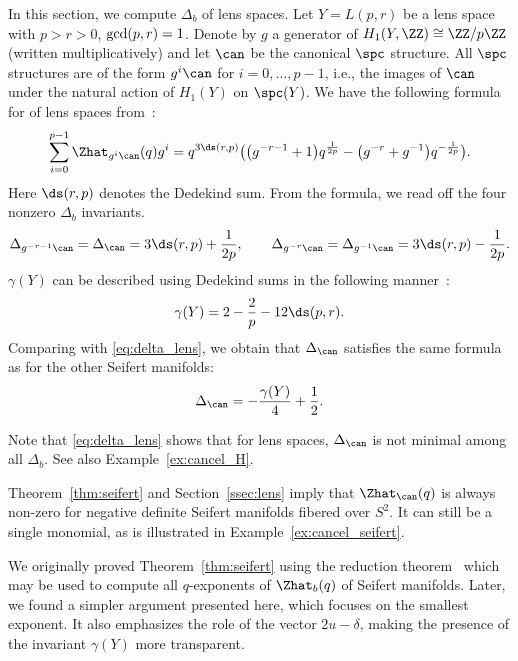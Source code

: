 \documentclass[pdftex]{sigma}
\begin{document}
In this section, we compute $\Delta_b$ of lens spaces. Let $Y= L(p,r) $ be a lens space with $p>r>0$, ${\rm gcd}(p,r)=1$. Denote by $g$ a generator of $H_1(Y,\ZZ) \cong \ZZ/p\ZZ$ (written multiplicatively) and let $\can$ be the canonical $\spc$ structure. All $\spc$ structures are of the form $g^i \can$ for $i=0, \dots, p-1$, i.e., the images of $\can$ under the natural action of $H_1(Y)$ on $\spc(Y)$.
 We have the following formula for  of lens spaces from~\cite[Section~4.2.]{GKS23}:
 \begin{equation*}
 \sum_{i=0}^{p-1} \Zhat_{g^i \can}(q)g^i
 = q^{3\ds(r,p)} \bigl(\bigl(g^{-r-1}+1\bigr) q^{\frac{1}{2p}} - \bigl(g^{-r}+g^{-1}\bigr) q^{-\frac{1}{2p}}\bigr).
 \end{equation*}
 Here $\ds(r,p)$ denotes the Dedekind sum. From the formula, we read off the four nonzero $\Delta_b$ invariants.
 \begin{equation}\label{eq:delta_lens}
 \Delta_{g^{-r-1}\can} = \Delta_{\can} = 3\ds(r,p) + \frac{1}{2p}, \qquad
 \Delta_{g^{-r}\can} = \Delta_{g^{-1}\can} = 3\ds(r,p) - \frac{1}{2p}.
 \end{equation}
$\gamma(Y)$ can be described using Dedekind sums in the following manner~\cite[p.~304]{NeNi02}:
\[
 \gamma(Y) = 2 - \frac{2}{p} - 12\ds(p,r).
\]
Comparing with \eqref{eq:delta_lens}, we obtain that $\Delta_{\can}$ satisfies the same formula as for the other Seifert manifolds:
\begin{equation*}
 \Delta_{\can} = -\frac{\gamma(Y)}{4} + \frac12.
\end{equation*}

Note that \eqref{eq:delta_lens} shows that for lens spaces, $\Delta_{\can}$ is not minimal among all $\Delta_b$. See also Example~\ref{ex:cancel_H}.


\begin{Remark}
 Theorem~\ref{thm:seifert} and Section~\ref{ssec:lens}
imply that $\Zhat_{\can}(q)$ is always non-zero for negative definite Seifert manifolds fibered over $S^2$. It can still be a single monomial, as is illustrated in Example~\ref{ex:cancel_seifert}.
\end{Remark}


\begin{Remark}
 We originally proved Theorem~\ref{thm:seifert} using the reduction theorem~\cite[Theorem~4.2]{GKS23} which may be used to compute all $q$-exponents of $\Zhat_b(q)$ of Seifert manifolds. Later, we found a simpler argument presented here, which focuses on the smallest exponent. It also emphasizes the role of the vector $2u-\delta$, making the presence of the invariant $\gamma(Y)$ more transparent.
\end{Remark}
\end{document}
